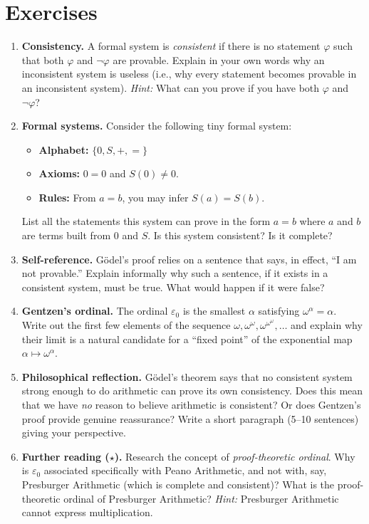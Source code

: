 \section{Exercises}

\begin{enumerate}

    \item \textbf{Consistency.} A formal system is \emph{consistent} if there is no statement $\varphi$ such that both $\varphi$ and $\neg\varphi$ are provable. Explain in your own words why an inconsistent system is useless (i.e., why every statement becomes provable in an inconsistent system). \emph{Hint:} What can you prove if you have both $\varphi$ and $\neg\varphi$?

    \item \textbf{Formal systems.} Consider the following tiny formal system:
    \begin{itemize}
        \item \textbf{Alphabet:} $\{0, S, +, =\}$
        \item \textbf{Axioms:} $0 = 0$ and $S(0) \neq 0$.
        \item \textbf{Rules:} From $a = b$, you may infer $S(a) = S(b)$.
    \end{itemize}
    List all the statements this system can prove in the form $a = b$ where $a$ and $b$ are terms built from $0$ and $S$. Is this system consistent? Is it complete?

    \item \textbf{Self-reference.} G\"odel's proof relies on a sentence that says, in effect, ``I am not provable.'' Explain informally why such a sentence, if it exists in a consistent system, must be true. What would happen if it were false?

    \item \textbf{Gentzen's ordinal.} The ordinal $\varepsilon_0$ is the smallest $\alpha$ satisfying $\omega^\alpha = \alpha$. Write out the first few elements of the sequence $\omega, \omega^\omega, \omega^{\omega^\omega}, \ldots$ and explain why their limit is a natural candidate for a ``fixed point'' of the exponential map $\alpha \mapsto \omega^\alpha$.

    \item \textbf{Philosophical reflection.} G\"odel's theorem says that no consistent system strong enough to do arithmetic can prove its own consistency. Does this mean that we have \emph{no} reason to believe arithmetic is consistent? Or does Gentzen's proof provide genuine reassurance? Write a short paragraph (5--10 sentences) giving your perspective.

    \item \textbf{Further reading ($\star$).} Research the concept of \emph{proof-theoretic ordinal}. Why is $\varepsilon_0$ associated specifically with Peano Arithmetic, and not with, say, Presburger Arithmetic (which is complete and consistent)? What is the proof-theoretic ordinal of Presburger Arithmetic? \emph{Hint:} Presburger Arithmetic cannot express multiplication.

\end{enumerate}

